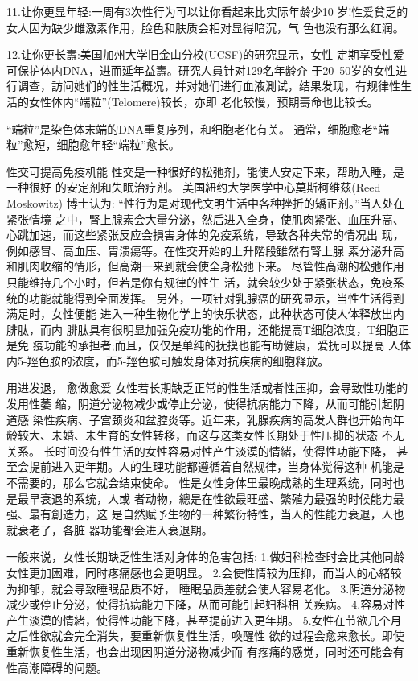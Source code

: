 \documentclass[12pt,UTF8]{ctexbook}
\begin{document}
11.让你更显年轻:一周有3次性行为可以让你看起来比实际年龄少10
岁!性爱貧乏的女人因为缺少雌激素作用，脸色和肤质会相对显得暗沉，气
色也没有那么红润。

12.让你更长壽:美国加州大学旧金山分校(UCSF)的研究显示，女性
定期享受性爱可保护体内DNA，进而延年益壽。研究人員针对129名年龄介
于20~50岁的女性进行调查，訪问她们的性生活概况，并对她们进行血液測试，结果发现，有规律性生活的女性体内“端粒”(Telomere)较长，亦即
老化较慢，预期壽命也比较长。

“端粒”是染色体末端的DNA重复序列，和细胞老化有关。
通常，细胞愈老“端粒”愈短，细胞愈年轻“端粒”愈长。

性交可提高免疫机能
性交是一种很好的松弛剂，能使人安定下来，帮助入睡，是一种很好
的安定剂和失眠治疗剂。
美国紐约大学医学中心莫斯柯维茲(Reed Moskowitz) 博士认为:
“性行为是对现代文明生活中各种挫折的矯正剂。”当人处在紧张情境
之中，腎上腺素会大量分泌，然后进入全身，使肌肉紧张、血压升高、心跳加速，而这些紧张反应会損害身体的免疫系统，导致各种失常的情况出
现，例如感冒、高血压、胃溃瘍等。在性交开始的上升階段雖然有腎上腺
素分泌升高和肌肉收缩的情形，但高潮一来到就会使全身松弛下来。
尽管性高潮的松弛作用只能维持几个小时，但若是你有规律的性生
活，就会较少处于紧张状态，免疫系统的功能就能得到全面发挥。
另外，一项针对乳腺癌的研究显示，当性生活得到满足时，女性便能
进入一种生物化学上的快乐状态，此种状态可使人体释放出内腓肽，而内
腓肽具有很明显加强免疫功能的作用，还能提高T细胞浓度，T细胞正是免
疫功能的承担者;而且，仅仅是单纯的抚摸也能有助健康，爱抚可以提高
人体内5-羥色胺的浓度，而5-羥色胺可触发身体对抗疾病的细胞释放。

用进发退，
愈做愈爱
女性若长期缺乏正常的性生活或者性压抑，会导致性功能的发用性萎
缩，阴道分泌物减少或停止分泌，使得抗病能力下降，从而可能引起阴道感
染性疾病、子宫颈炎和盆腔炎等。近年来，乳腺疾病的高发人群也开始向年
龄较大、未婚、未生育的女性转移，而这与这类女性长期处于性压抑的状态
不无关系。
长时间没有性生活的女性容易对性产生淡漠的情緒，使得性功能下降，
甚至会提前进入更年期。人的生理功能都遵循着自然规律，当身体觉得这种
机能是不需要的，那么它就会结束使命。
性是女性身体里最晚成熟的生理系统，同时也是最早衰退的系统，人或
者动物，總是在性欲最旺盛、繁殖力最强的时候能力最强、最有創造力，这
是自然赋予生物的一种繁衍特性，当人的性能力衰退，人也就衰老了，各脏
器功能都会进入衰退期。

一般来说，女性长期缺乏性生活对身体的危害包括:
1.做妇科检查时会比其他同龄女性更加困难，同时疼痛感也会更明显。
2.会使性情较为压抑，而当人的心緒较为抑郁，就会导致睡眠品质不好，
睡眠品质差就会使人容易老化。
3.阴道分泌物减少或停止分泌，使得抗病能力下降，从而可能引起妇科相
关疾病。
4.容易对性产生淡漠的情緒，使得性功能下降，甚至提前进入更年期。
5.女性在节欲几个月之后性欲就会完全消失，要重新恢复性生活，喚醒性
欲的过程会愈来愈长。即使重新恢复性生活，也会出现因阴道分泌物减少而
有疼痛的感觉，同时还可能会有性高潮障碍的问题。
\end{document}
